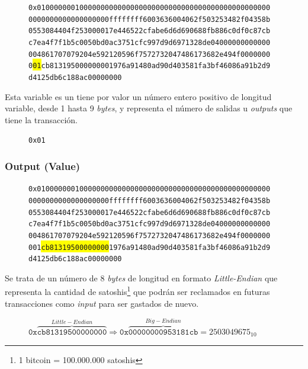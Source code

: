 \documentclass{article}
\begin{document}
    \begin{figure}[H]
        \texttt{0x0100000001000000000000000000000000000000000000000000000} \\
        \texttt{0000000000000000000ffffffff6003636004062f503253482f04358b} \\
        \texttt{0553084404f253000017e446522cfabe6d6d690688fb886c0df0c87cb} \\
        \texttt{c7ea4f7f1b5c0050bd0ac3751cfc997d9d6971328de04000000000000} \\
        \texttt{004861707079204e592120596f7572732047486173682e494f0000000} \\
        \texttt{0\colorbox{Yellow}{01}cb813195000000001976a91480ad90d403581fa3bf46086a91b2d9} \\
        \texttt{d4125db6c188ac00000000}
    \end{figure}
    
    Esta variable es un tiene por valor un número entero positivo de longitud variable, desde 1 hasta 9 \textit{bytes}, y representa el número de salidas u \textit{outputs} que tiene la transacción.
    \begin{figure}[H]
        \texttt{0x01}
    \end{figure}
    
    \subsubsection{Output (Value)}
    
    \begin{figure}[H]
        \texttt{0x0100000001000000000000000000000000000000000000000000000} \\
        \texttt{0000000000000000000ffffffff6003636004062f503253482f04358b} \\
        \texttt{0553084404f253000017e446522cfabe6d6d690688fb886c0df0c87cb} \\
        \texttt{c7ea4f7f1b5c0050bd0ac3751cfc997d9d6971328de04000000000000} \\
        \texttt{004861707079204e592120596f7572732047486173682e494f0000000} \\
        \texttt{001\colorbox{Yellow}{cb81319500000000}1976a91480ad90d403581fa3bf46086a91b2d9} \\
        \texttt{d4125db6c188ac00000000}
    \end{figure}
    
    Se trata de un número de 8 \textit{bytes} de longitud en formato \textit{Little-Endian} que representa la cantidad de satoshis\footnote{1 bitcoin = 100.000.000 satoshis} que podrán ser reclamados en futuras transacciones como \textit{input} para ser gastados de nuevo.
    \begin{figure}[H]
    \centering
        $\texttt{0x}\overbrace{\texttt{cb81319500000000}}^{Little-Endian} \Rightarrow \texttt{0x}\overbrace{\texttt{00000000953181cb}}^{Big-Endian} = 2503049675_{10}$
    \end{figure}
    
\end{document}
